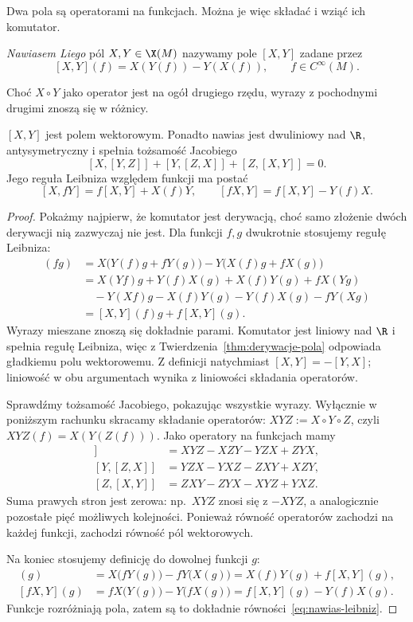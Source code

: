 Dwa pola są operatorami na funkcjach. Można je więc składać i wziąć
ich komutator.
\begin{definicja}
\emph{Nawiasem Liego} pól $X,Y\in\X(M)$ nazywamy pole $[X,Y]$ zadane przez
\begin{equation}\label{eq:nawias-def}
 [X,Y](f)=X(Y(f))-Y(X(f)),\qquad f\in C^\infty(M).
\end{equation}
\end{definicja}

Choć $X\circ Y$ jako operator jest na ogół drugiego rzędu, wyrazy z
pochodnymi drugimi znoszą się w różnicy.
\begin{fakt}\label{fakt:nawias-wlasnosci}
$[X,Y]$ jest polem wektorowym. Ponadto nawias jest dwuliniowy nad $\R$,
antysymetryczny i spełnia tożsamość Jacobiego
\[
 [X,[Y,Z]]+[Y,[Z,X]]+[Z,[X,Y]]=0.
\]
Jego reguła Leibniza względem funkcji ma postać
\begin{equation}\label{eq:nawias-leibniz}
 [X,fY]=f[X,Y]+X(f)Y,\qquad [fX,Y]=f[X,Y]-Y(f)X.
\end{equation}
\end{fakt}
\begin{proof}
Pokażmy najpierw, że komutator jest derywacją, choć samo
złożenie dwóch derywacji nią zazwyczaj nie jest.
Dla funkcji $f,g$ dwukrotnie stosujemy regułę Leibniza:
\begin{align*}
[X,Y](fg)
&=X\bigl(Y(f)g+fY(g)\bigr)
  -Y\bigl(X(f)g+fX(g)\bigr)\\
&=X(Yf)g+Y(f)X(g)+X(f)Y(g)+fX(Yg)\\
&\quad-Y(Xf)g-X(f)Y(g)-Y(f)X(g)-fY(Xg)\\
&=[X,Y](f)g+f[X,Y](g).
\end{align*}
Wyrazy mieszane znoszą się dokładnie parami. Komutator
jest liniowy nad $\R$ i spełnia regułę Leibniza,
więc z Twierdzenia~\ref{thm:derywacje-pola} odpowiada
gładkiemu polu wektorowemu. Z definicji natychmiast
$[X,Y]=-[Y,X]$; liniowość w obu argumentach wynika
z liniowości składania operatorów.

Sprawdźmy tożsamość Jacobiego, pokazując wszystkie
wyrazy. Wyłącznie w poniższym rachunku skracamy składanie
operatorów: $XYZ:=X\circ Y\circ Z$, czyli
$XYZ(f)=X(Y(Z(f)))$. Jako operatory na funkcjach mamy
\begin{align*}
[X,[Y,Z]]&=XYZ-XZY-YZX+ZYX,\\
[Y,[Z,X]]&=YZX-YXZ-ZXY+XZY,\\
[Z,[X,Y]]&=ZXY-ZYX-XYZ+YXZ.
\end{align*}
Suma prawych stron jest zerowa: np.\ $XYZ$ znosi się
z $-XYZ$, a analogicznie pozostałe pięć możliwych
kolejności. Ponieważ równość operatorów zachodzi na
każdej funkcji, zachodzi równość pól wektorowych.

Na koniec stosujemy definicję do dowolnej funkcji $g$:
\begin{align*}
[X,fY](g)
 &=X\bigl(fY(g)\bigr)-fY\bigl(X(g)\bigr)
  =X(f)Y(g)+f[X,Y](g),\\
[fX,Y](g)
 &=fX\bigl(Y(g)\bigr)-Y\bigl(fX(g)\bigr)
  =f[X,Y](g)-Y(f)X(g).
\end{align*}
Funkcje rozróżniają pola, zatem są to dokładnie
równości~\eqref{eq:nawias-leibniz}.
\end{proof}

